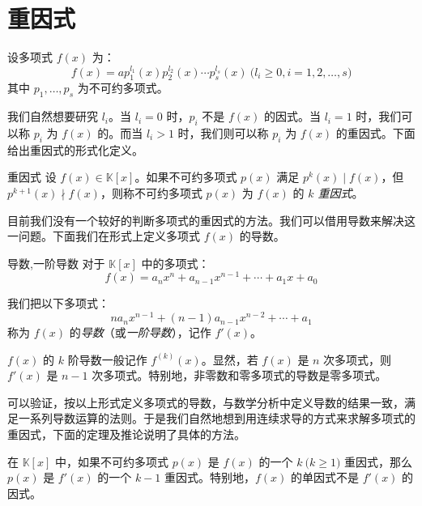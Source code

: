 
\section{重因式}

设多项式 $f(x)$ 为：
$$
f(x) = a p_1^{l_1}(x) p_2^{l_2}(x) \cdots p_s^{l_s}(x) \pod{l_i \ge 0, i = 1, 2, \ldots, s}
$$
其中 $p_1, \ldots, p_s$ 为不可约多项式。

我们自然想要研究 $l_i$。当 $l_i = 0$ 时，$p_i$ 不是 $f(x)$ 的因式。当 $l_i = 1$ 时，我们可以称 $p_i$ 为 $f(x)$ 的\emph{}。而当 $l_i > 1$ 时，我们则可以称 $p_i$ 为 $f(x)$ 的重因式。下面给出重因式的形式化定义。

\begin{definition}{重因式}
	设 $f(x) \in \mathbb K[x]$。如果不可约多项式 $p(x)$ 满足 $p^k(x) \mid f(x)$，但 $p^{k + 1}(x) \nmid f(x)$，则称不可约多项式 $p(x)$ 为 $f(x)$ 的 \emph{$k$ 重因式}。
\end{definition}

目前我们没有一个较好的判断多项式的重因式的方法。我们可以借用导数来解决这一问题。下面我们在形式上定义多项式 $f(x)$ 的导数。

\begin{definition}{导数,一阶导数}
	对于 $\mathbb K[x]$ 中的多项式：
	$$
	f(x) = a_n x^n + a_{n - 1} x^{n - 1} + \cdots + a_1 x + a_0
	$$

	我们把以下多项式：
	$$
	n a_n x^{n - 1} + (n - 1) a_{n - 1} x^{n - 2} + \cdots + a_1
	$$
	称为 $f(x)$ 的\emph{导数}（或\emph{一阶导数}），记作 $f'(x)$。
\end{definition}

$f(x)$ 的 $k$ 阶导数一般记作 $f^{(k)}(x)$。显然，若 $f(x)$ 是 $n$ 次多项式，则 $f'(x)$ 是 $n - 1$ 次多项式。特别地，非零数和零多项式的导数是零多项式。

可以验证，按以上形式定义多项式的导数，与数学分析中定义导数的结果一致，满足一系列导数运算的法则。于是我们自然地想到用连续求导的方式来求解多项式的重因式，下面的定理及推论说明了具体的方法。

\begin{proposition}
	在 $\mathbb K[x]$ 中，如果不可约多项式 $p(x)$ 是 $f(x)$ 的一个 $k \pod{k \ge 1}$ 重因式，那么 $p(x)$ 是 $f'(x)$ 的一个 $k - 1$ 重因式。特别地，$f(x)$ 的单因式不是 $f'(x)$ 的因式。
\end{proposition}

